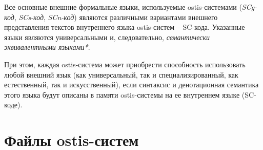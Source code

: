 Все основные внешние формальные языки, используемые ostis-системами (\textit{SCg-код}, \textit{SCs-код}, \textit{SCn-код}) являются различными вариантами внешнего представления текстов внутреннего языка ostis-систем -- SC-кода. Указанные языки являются универсальными и, следовательно, \textit{семантически эквивалентными языками*}.

При этом, каждая ostis-система может приобрести способность использовать любой внешний язык (как универсальный, так и специализированный, как естественный, так и искусственный), если синтаксис и денотационная семантика этого языка будут описаны в памяти ostis-системы на ее внутреннем языке (SC-коде).

\section{Файлы ostis-систем}

%